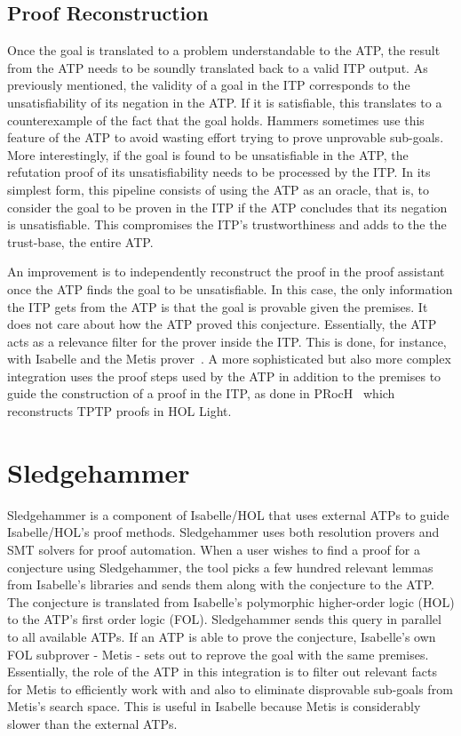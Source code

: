 \documentclass{article}
\begin{document}
		\subsection{Proof Reconstruction}
		Once the goal is translated to a problem understandable 
		to the ATP, the result from the ATP needs to be 
		soundly translated back to a valid ITP output.
		As previously mentioned, the validity of a goal in 
		the ITP corresponds to the unsatisfiability of its 
		negation in the ATP. If it is satisfiable, this 
		translates to a counterexample of the fact that 
		the goal holds. Hammers sometimes use this 
		feature of the ATP to avoid wasting effort 
		trying to prove unprovable sub-goals. More 
		interestingly, if the goal is found to be 
		unsatisfiable in the ATP, the refutation proof of 
		its unsatisfiability needs to be processed by the 
		ITP. In its simplest form, this pipeline consists 
		of using the ATP as an oracle, that is, to consider 
		the goal to be proven in the ITP if the ATP 
		concludes that its negation is unsatisfiable. 
		This compromises the ITP's trustworthiness and adds 
		to the the trust-base, the entire ATP.
		
		An improvement is to independently reconstruct 
		the proof in the proof assistant once the ATP finds 
		the goal to be unsatisfiable. In this case, the 
		only information the ITP gets from the ATP is that 
		the goal is provable given the premises. It does 
		not care about how the ATP proved this conjecture.
		Essentially, the ATP acts as a relevance filter for 
		the prover inside the ITP. This is done, for instance, 
		with Isabelle and the Metis 
		prover~\cite{10.1007/978-3-540-74591-4_18}. A more
		sophisticated but also more complex
		integration uses the proof steps used by 
		the ATP in addition to the premises
		to guide the construction of a proof in the ITP, 
		as done in 
		PRocH~\cite{10.1007/978-3-642-38574-2_18} which 
		reconstructs TPTP proofs in HOL Light.
		
\section{Sledgehammer}
\label{sec:sledgehammer}
	Sledgehammer is a component of Isabelle/HOL that uses 
	external ATPs to guide Isabelle/HOL's proof methods. 
	Sledgehammer uses both resolution provers and 
	SMT solvers for proof automation. When a user wishes 
	to find a proof for a conjecture using Sledgehammer, 
	the tool picks a few hundred relevant lemmas from 
	Isabelle's libraries and sends them along 
	with the conjecture to the ATP. The conjecture is 
	translated from Isabelle's polymorphic higher-order 
	logic (HOL) to the ATP's first order logic (FOL).
	Sledgehammer sends this query in parallel to
	all available ATPs. If an ATP is able to prove 
	the conjecture, Isabelle's own FOL subprover - Metis - 
	sets out to reprove the goal with the same premises. 
	Essentially, the role of the ATP in this integration 
	is to filter out relevant facts for Metis to 
	efficiently work with and also to eliminate 
	disprovable sub-goals from Metis's search space.
	This is useful in Isabelle because Metis is 
	considerably slower	than the external ATPs.
	
\end{document}
